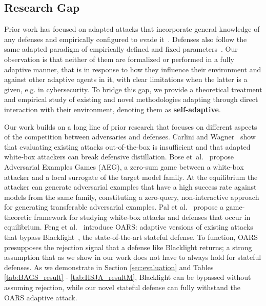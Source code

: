 \subsection{Research Gap}
Prior work has focused on adapted attacks that incorporate general knowledge of any defenses and empirically configured to evade it~\cite{carlini2017towards, chen2020hopskipjumpattack, brendel2018decision}.
Defenses also follow the same adapted paradigm of empirically defined and fixed parameters~\cite{chen2020stateful, li2022blacklight}.
Our observation is that neither of them are formalized or performed in a fully adaptive manner, that is in response to how they influence their environment and against other adaptive agents in it, with clear limitations when the latter is a given, e.g. in cybersecurity.
To bridge this gap, we provide a theoretical treatment and empirical study of existing and novel methodologies adapting through direct interaction with their environment, denoting them as \textbf{self-adaptive}.

Our work builds on a long line of prior research that focuses on different aspects of the competition between adversaries and defenses.
Carlini and Wagner~\cite{carlini2017towards} show that evaluating existing attacks out-of-the-box is insufficient and that adapted white-box attackers can break defensive distillation.
Bose et~al.~\cite{bose2020adversarial} propose Adversarial Examples Games (AEG), a zero-sum game between a white-box attacker and a local surrogate of the target model family.
At the equilibrium the attacker can generate adversarial examples that have a high success rate against models from the same family, constituting a zero-query, non-interactive approach for generating transferable adversarial examples.
Pal et al.~\cite{pal2020game} propose a game-theoretic framework for studying white-box attacks and defenses that occur in equilibrium.
Feng et al.~\cite{feng2023stateful} introduce OARS: adaptive versions of existing attacks that bypass Blacklight~\cite{li2022blacklight}, the state-of-the-art stateful defense.
To function, OARS presupposes the rejection signal that a defense like Blacklight returns; a strong assumption that as we show in our work does not have to always hold for stateful defenses.
As we demonstrate in Section \ref{sec:evaluation} and Tables \ref{tab:BAGS_result} - \ref{tab:HSJA_resultM}, Blacklight can be bypassed without assuming rejection, while our novel stateful defense can fully withstand the OARS adaptive attack.

